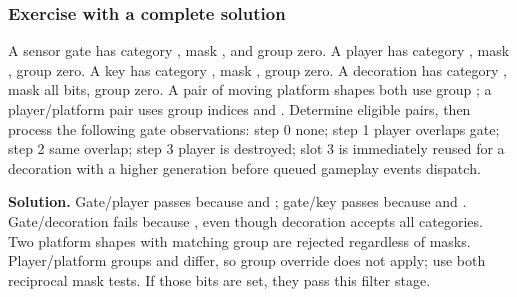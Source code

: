 \begin{allmightroleexercise}

\subsubsection{Exercise with a complete solution}\label{05-engine-i-ch017-exercise-with-a-complete-solution}

\hypertarget{05-engine-i-ch017-exercise-with-a-complete-solution}{}

A sensor gate has category , mask , and group zero. A player has category , mask , group zero. A key has category , mask , group zero. A decoration has category , mask all bits, group zero. A pair of moving platform shapes both use group ; a player/platform pair uses group indices  and . Determine eligible pairs, then process the following gate observations: step 0 none; step 1 player overlaps gate; step 2 same overlap; step 3 player is destroyed; slot 3 is immediately reused for a decoration with a higher generation before queued gameplay events dispatch.

\end{allmightroleexercise}

\textbf{Solution.} Gate/player passes because  and ; gate/key passes because  and . Gate/decoration fails because , even though decoration accepts all categories. Two platform shapes with matching group  are rejected regardless of masks. Player/platform groups  and  differ, so group override does not apply; use both reciprocal mask tests. If those bits are set, they pass this filter stage.

